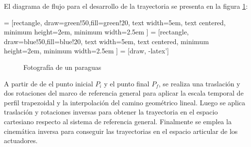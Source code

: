     
        El diagrama de flujo para el desarrollo de la trayectoria se presenta en la figura \ref{f:cap6_trayectory_112129}:
    
         = [rectangle, draw=green!50,fill=green!20, text width=5em, text centered, minimum height=2em, minimum width=2.5em ]
         = [rectangle, draw=blue!50,fill=blue!20, text width=5em, text centered, minimum height=2em, minimum width=2.5em ]
         = [draw, -latex']
         \begin{center}
         \begin{figure}[htb]
                \caption{Fotografía de un paraguas}
                \label{f:cap6_trayectory_112129}
         \end{figure}
         \end{center}
        \vspace{-1.3cm}   

    A partir de de el punto inicial $P_i$ y el punto final $P_f$, se realiza una traslación y dos rotaciones del marco de referencia general para aplicar la escala temporal de perfil trapezoidal y la interpolación del camino geométrico lineal. Luego se aplica traslación y rotaciones inversas para obtener la trayectoria en el espacio cartesiano respecto al sistema de referencia general. Finalmente se emplea la cinemática inversa para conseguir las trayectorias en el espacio articular de los actuadores.     
    
